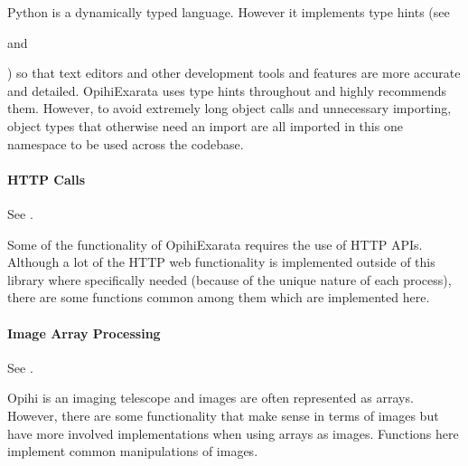 \documentclass[letterpaper,11pt,english]{sphinxmanual}
\begin{document}
\sphinxAtStartPar
Python is a dynamically typed language. However it implements type hints
(see %
\begin{footnote}[49]\sphinxAtStartFootnote
{}
%
\end{footnote} and %
\begin{footnote}[50]\sphinxAtStartFootnote
{}
%
\end{footnote}) so that text editors and other development
tools and features are more accurate and detailed. OpihiExarata uses type hints
throughout and highly recommends them. However, to avoid extremely long
object calls and unnecessary importing, object types that otherwise need an
import are all imported in this one namespace to be used across the codebase.


\paragraph{HTTP Calls}
\label{\detokenize{technical/architecture/library:http-calls}}
\sphinxAtStartPar
See {\hyperref[\detokenize{code/opihiexarata.library.http:module-opihiexarata.library.http}]{}}.

\sphinxAtStartPar
Some of the functionality of OpihiExarata requires the use of HTTP APIs.
Although a lot of the HTTP web functionality is implemented outside of this
library where specifically needed (because of the unique nature of each
process), there are some functions common among them which are implemented
here.


\paragraph{Image Array Processing}
\label{\detokenize{technical/architecture/library:image-array-processing}}
\sphinxAtStartPar
See {\hyperref[\detokenize{code/opihiexarata.library.image:module-opihiexarata.library.image}]{}}.

\sphinxAtStartPar
Opihi is an imaging telescope and images are often represented as arrays.
However, there are some functionality that make sense in terms of images but
have more involved implementations when using arrays as images. Functions
here implement common manipulations of images.
\end{document}
